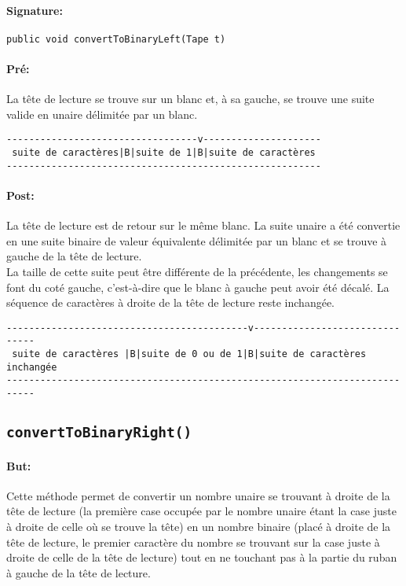 \documentclass[a4paper,11pt]{article}
\begin{document}
\paragraph{Signature:} \texttt{public void convertToBinaryLeft(Tape t)}
\paragraph{Pré:}
La tête de lecture se trouve sur un blanc et, à sa gauche, se trouve une suite valide en unaire délimitée par un blanc.
\begin{verbatim}
----------------------------------v---------------------
 suite de caractères|B|suite de 1|B|suite de caractères
--------------------------------------------------------
\end{verbatim}
\paragraph{Post:}
La tête de lecture est de retour sur le même blanc. La suite unaire a été convertie en une suite binaire de valeur équivalente délimitée par un blanc et se trouve à gauche de la tête de lecture.\\
La taille de cette suite peut être différente de la précédente, les changements se font du coté gauche, c'est-à-dire que le blanc à gauche peut avoir été décalé. La séquence de caractères à droite de la tête de lecture reste inchangée.
\begin{verbatim}
-------------------------------------------v-------------------------------
 suite de caractères |B|suite de 0 ou de 1|B|suite de caractères inchangée
---------------------------------------------------------------------------
\end{verbatim}
\subsection{\texttt{convertToBinaryRight()}}
\paragraph{But:} Cette méthode permet de convertir un nombre unaire se trouvant à droite de la tête de lecture (la première case occupée par le nombre unaire étant la case juste à droite de celle où se trouve la tête) en un nombre binaire (placé à droite de la tête de lecture, le premier caractère du nombre se trouvant sur la case juste à droite de celle de la tête de lecture) tout en ne touchant pas à la partie du ruban à gauche de la tête de lecture.
\end{document}
